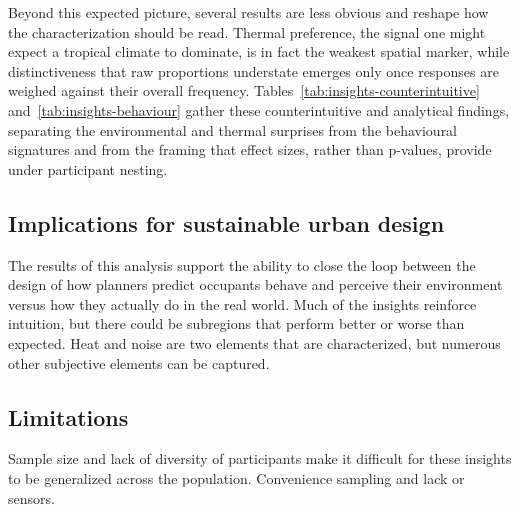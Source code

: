 \documentclass[]{interact}
\begin{document}



Beyond this expected picture, several results are less obvious and reshape how the characterization should be read.
Thermal preference, the signal one might expect a tropical climate to dominate, is in fact the weakest spatial marker, while distinctiveness that raw proportions understate emerges only once responses are weighed against their overall frequency.
Tables~\ref{tab:insights-counterintuitive} and~\ref{tab:insights-behaviour} gather these counterintuitive and analytical findings, separating the environmental and thermal surprises from the behavioural signatures and from the framing that effect sizes, rather than p-values, provide under participant nesting.




\subsection{Implications for sustainable urban design}\label{sec:disc-implications}
The results of this analysis support the ability to close the loop between the design of how planners predict occupants behave and perceive their environment versus how they actually do in the real world. 
Much of the insights reinforce intuition, but there could be subregions that perform better or worse than expected.
Heat and noise are two elements that are characterized, but numerous other subjective elements can be captured.

\subsection{Limitations}\label{sec:disc-limitations}
Sample size and lack of diversity of participants make it difficult for these insights to be generalized across the population.
Convenience sampling and lack or sensors.
\end{document}
